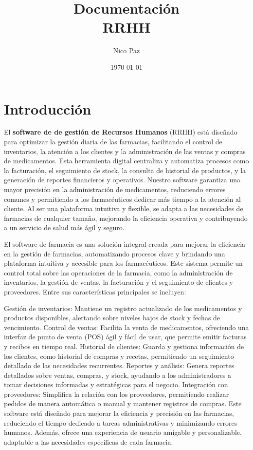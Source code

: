 \documentclass[a4paper]{scrartcl}
\begin{document}
\title{Documentación\\RRHH}
\author{Nico Paz}
\date{\today}
\maketitle
\tableofcontents
\clearpage

\section{Introducción}

El \textbf{software de de gestión de Recursos Humanos} (RRHH) está diseñado para optimizar la gestión diaria de las farmacias, facilitando
el control de inventarios, la atención a los clientes y la administración de las ventas y compras de
medicamentos. Esta herramienta digital centraliza y automatiza procesos como la facturación, el
seguimiento de stock, la consulta de historial de productos, y la generación de reportes financieros y
operativos.
Nuestro software garantiza una mayor precisión en la administración de medicamentos, reduciendo
errores comunes y permitiendo a los farmacéuticos dedicar más tiempo a la atención al cliente. Al
ser una plataforma intuitiva y flexible, se adapta a las necesidades de farmacias de cualquier
tamaño, mejorando la eficiencia operativa y contribuyendo a un servicio de salud más ágil y seguro.


El software de farmacia es una solución integral creada para mejorar la eficiencia en la gestión de
farmacias, automatizando procesos clave y brindando una plataforma intuitiva y accesible para los
farmacéuticos. Este sistema permite un control total sobre las operaciones de la farmacia, como la
administración de inventarios, la gestión de ventas, la facturación y el seguimiento de clientes y
proveedores.
Entre sus características principales se incluyen:
\begin{itemize}
	\ii Gestión de inventarios: Mantiene un registro actualizado de los medicamentos y productos
	disponibles, alertando sobre niveles bajos de stock y fechas de vencimiento.
	\ii Control de ventas: Facilita la venta de medicamentos, ofreciendo una interfaz de punto de
	venta (POS) ágil y fácil de usar, que permite emitir facturas y recibos en tiempo real.
	\ii Historial de clientes: Guarda y gestiona información de los clientes, como historial de
	compras y recetas, permitiendo un seguimiento detallado de las necesidades recurrentes.
	\ii Reportes y análisis: Genera reportes detallados sobre ventas, compras, y stock, ayudando a
	los administradores a tomar decisiones informadas y estratégicas para el negocio.
	\ii Integración con proveedores: Simplifica la relación con los proveedores, permitiendo
	realizar pedidos de manera automática o manual y mantener registros de compras.
	Este software está diseñado para mejorar la eficiencia y precisión en las farmacias, reduciendo el
	tiempo dedicado a tareas administrativas y minimizando errores humanos. Además, ofrece una
	experiencia de usuario amigable y personalizable, adaptable a las necesidades específicas de cada
	farmacia.
\end{itemize}
\clearpage
\end{document}
